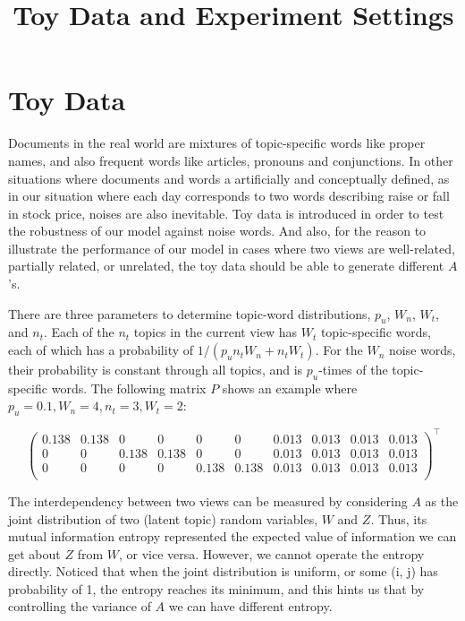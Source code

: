 \documentclass[12pt]{article}
\begin{document}
\title{Toy Data and Experiment Settings}

\maketitle
\section{Toy Data}
Documents in the real world are mixtures of topic-specific words like proper names, and also frequent words like articles, pronouns and conjunctions. In other situations where documents and words a artificially and conceptually defined, as in our situation where each day corresponds to two words describing raise or fall in stock price, noises are also inevitable. Toy data is introduced in order to test the robustness of our model against noise words. And also, for the reason to illustrate the performance of our model in cases where two views are well-related, partially related, or unrelated, the toy data should be able to generate different $A$'s.

There are three parameters to determine topic-word distributions, $p_u$, $W_n$, $W_t$, and $n_t$. Each of the $n_t$ topics in the current view has $W_t$ topic-specific words, each of which has a probability of $1/(p_un_tW_n+n_tW_t)$. For the $W_n$ noise words, their probability is constant through all topics, and is $p_u$-times of the topic-specific words. The following matrix $P$ shows an example where $p_u=0.1, W_n=4, n_t=3, W_t=2$:

\begin{equation*}
\left(          
  \begin{array}{cccccccccc}   
    0.138 & 0.138 & 0& 0& 0& 0& 0.013 & 0.013 & 0.013 & 0.013 \\
    0& 0& 0.138 & 0.138 & 0& 0& 0.013 & 0.013 & 0.013 & 0.013 \\
    0& 0& 0& 0& 0.138 & 0.138 & 0.013 & 0.013 & 0.013 & 0.013 \\
  \end{array}
\right)^\top
\end{equation*}

The interdependency between two views can be measured by considering $A$ as the joint distribution of two (latent topic) random variables, $W$ and $Z$. Thus, its mutual information entropy represented the expected value of information we can get about $Z$ from $W$, or vice versa. However, we cannot operate the entropy directly. Noticed that when the joint distribution is uniform, or some (i, j) has probability of 1, the entropy reaches its minimum, and this hints us that by controlling the variance of $A$ we can have different entropy.
\end{document}
